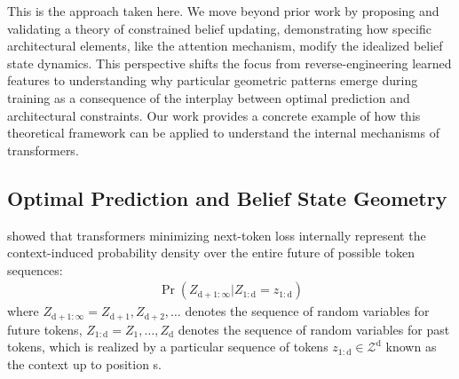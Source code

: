 \documentclass{article}
\theoremstyle{plain}
\theoremstyle{definition}
\theoremstyle{remark}
\begin{document}
This is the approach taken 
here. %
We move beyond prior work by proposing and validating a theory of constrained belief updating, demonstrating how specific architectural elements, like the attention mechanism, modify the idealized belief state dynamics. This perspective shifts the focus from reverse-engineering learned features to understanding why particular geometric patterns emerge during training as a consequence of the interplay between optimal prediction and architectural constraints. Our work provides a concrete example of how this theoretical framework can be applied to understand the internal mechanisms of transformers.


\subsection{Optimal Prediction and Belief State Geometry}

\citet{shai2024transformersrepresentbeliefstate} showed that transformers minimizing next-token loss internally represent the context-induced probability density over the entire future of possible token sequences:
\begin{align}
    \Pr(Z_{\text{d}+1:\infty} | Z_{1:\text{d}} = z_{1:\text{d}})
\end{align}
where $Z_{\text{d}+1:\infty} = Z_{\text{d}+1}, Z_{\text{d}+2},\dots$ denotes the sequence of random variables for future tokens, $Z_{1:\text{d}} = Z_1, \dots, Z_\text{d}$ denotes the sequence of random variables for past tokens, which is realized by a particular sequence of tokens $z_{1:\text{d}} \in \mathcal{Z}^\text{d}$ %
known as 
the context 
up to position s. 
\end{document}
